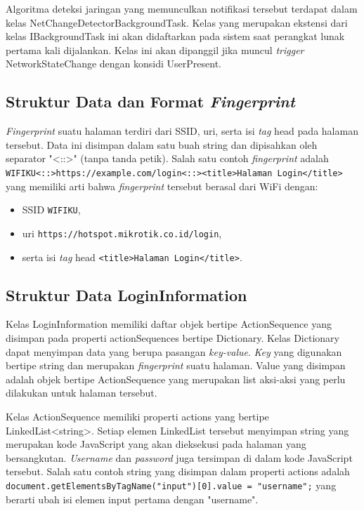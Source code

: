 Algoritma deteksi jaringan yang memunculkan notifikasi tersebut terdapat dalam kelas NetChangeDetectorBackgroundTask. Kelas yang merupakan ekstensi dari kelas IBackgroundTask ini akan didaftarkan pada sistem saat perangkat lunak pertama kali dijalankan. Kelas ini akan dipanggil jika muncul \textit{trigger} NetworkStateChange dengan konsidi UserPresent.

\subsection{Struktur Data dan Format \textit{Fingerprint}}
\label{subsec:struktur_data_dan_format_fingerprint}

\textit{Fingerprint} suatu halaman terdiri dari SSID, uri, serta isi \textit{tag} head pada halaman tersebut. Data ini disimpan dalam satu buah string dan dipisahkan oleh separator "<::>" (tanpa tanda petik). Salah satu contoh \textit{fingerprint} adalah \texttt{WIFIKU<::>https://example.com/login<::><title>Halaman Login</title>} yang memiliki arti bahwa \textit{fingerprint} tersebut berasal dari WiFi dengan:

\begin{itemize}
    \item{SSID \texttt{WIFIKU},}
    \item{uri \texttt{https://hotspot.mikrotik.co.id/login},}
    \item{serta isi \textit{tag} head \texttt{<title>Halaman Login</title>}.}
\end{itemize}

\subsection{Struktur Data LoginInformation}
\label{subsec:struktur_data_logininformation}

Kelas LoginInformation memiliki daftar objek bertipe ActionSequence yang disimpan pada properti actionSequences bertipe Dictionary. Kelas Dictionary dapat menyimpan data yang berupa pasangan \textit{key-value}. \textit{Key} yang digunakan bertipe string dan merupakan \textit{fingerprint} suatu halaman. Value yang disimpan adalah objek bertipe ActionSequence yang merupakan list aksi-aksi yang perlu dilakukan untuk halaman tersebut.

Kelas ActionSequence memiliki properti actions yang bertipe LinkedList<string>. Setiap elemen LinkedList tersebut menyimpan string yang merupakan kode JavaScript yang akan dieksekusi pada halaman yang bersangkutan. \textit{Username} dan \textit{password} juga tersimpan di dalam kode JavaScript tersebut. Salah satu contoh string yang disimpan dalam properti actions adalah \texttt{document.getElementsByTagName("input")[0].value = "username";} yang berarti ubah isi elemen input pertama dengan "username".


